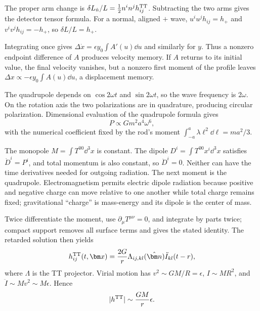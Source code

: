 \begin{solutions}
\begin{solution}
The proper arm change is
\(\delta L_{\hat n}/L=\tfrac12n^in^jh_{ij}^{\rm TT}\).  Subtracting the two
arms gives the detector tensor formula.  For a normal, aligned \(+\) wave,
\(u^iu^jh_{ij}=h_+\) and \(v^iv^jh_{ij}=-h_+\), so
\(\delta L/L=h_+\).
\end{solution}

\begin{solution}
Integrating once gives
\(\Delta\dot x=\epsilon y_0\int A'(u)\dd u\) and similarly for \(y\).
Thus a nonzero endpoint difference of \(A\) produces velocity memory.
If \(A\) returns to its initial value, the final velocity vanishes, but a
nonzero first moment of the profile leaves
\(\Delta x\propto-\epsilon y_0\int A(u)\dd u\), a displacement memory.
\end{solution}

\begin{solution}
The quadrupole depends on \(\cos2\omega t\) and \(\sin2\omega t\), so the wave
frequency is \(2\omega\).  On the rotation axis the two polarizations are in
quadrature, producing circular polarization.  Dimensional evaluation of the
quadrupole formula gives
\[
P\propto Gm^2a^4\omega^6,
\]
with the numerical coefficient fixed by the rod's moment
\(\int_{-a}^a\lambda \ell^2\dd\ell=ma^2/3\).
\end{solution}

\begin{solution}
The monopole \(M=\int T^{00}\dd^3x\) is constant.  The dipole
\(D^i=\int T^{00}x^i\dd^3x\) satisfies
\(\dot D^i=P^i\), and total momentum is also constant, so
\(\ddot D^i=0\).  Neither can have the time derivatives needed for outgoing
radiation.  The next moment is the quadrupole.  Electromagnetism permits
electric dipole radiation because positive and negative charge can move
relative to one another while total charge remains fixed; gravitational
``charge'' is mass-energy and its dipole is the center of mass.
\end{solution}

\begin{solution}
Twice differentiate the moment, use
\(\partial_\mu T^{\mu\nu}=0\), and integrate by parts twice; compact support
removes all surface terms and gives the stated identity.  The retarded
solution then yields
\[
h^{\rm TT}_{ij}(t,\bm x)
=\frac{2G}{r}\Lambda_{ij,kl}(\hat{\bm n})
\ddot I_{kl}(t-r),
\]
where \(\Lambda\) is the TT projector.  Virial motion has
\(v^2\sim GM/R=\epsilon\), \(I\sim MR^2\), and
\(\ddot I\sim Mv^2\sim M\epsilon\).  Hence
\[
|h^{\rm TT}|\sim\frac{GM}{r}\epsilon.
\]
\end{solution}


\end{solutions}
